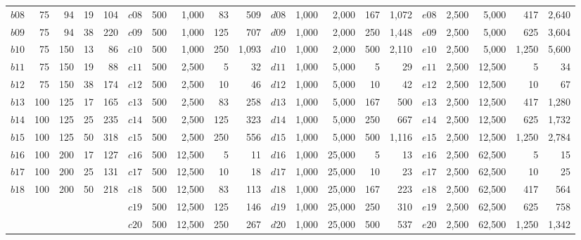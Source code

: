 \documentclass[preprint]{elsarticle}
\begin{document}
\begin{table}[h]
\begin{adjustbox}{width=\textwidth}
\begin{tabular}{lrrrr|lrrrr|lrrrr|lrrrr}
$b08$ & 75 & 94 & 19 & 104& $c08$ & 500 & 1,000 & 83 & 509&  $d08$ & 1,000 & 2,000 & 167 & 1,072& $e08$ & 2,500 & 5,000 & 417 & 2,640\\
$b09$ & 75 & 94 & 38 & 220& $c09$ & 500 & 1,000 & 125 & 707&  $d09$ & 1,000 & 2,000 & 250 & 1,448& $e09$ & 2,500 & 5,000 & 625 & 3,604\\
$b10$ & 75 & 150 & 13 & 86& $c10$ & 500 & 1,000 & 250 &1,093&  $d10$ & 1,000 & 2,000 & 500 & 2,110& $e10$ & 2,500 & 5,000 & 1,250 &5,600\\
$b11$ & 75 & 150 & 19 & 88& $c11$ & 500 & 2,500 & 5 &32&  $d11$ & 1,000 & 5,000 & 5 & 29& $e11$ & 2,500 & 12,500 & 5 &34\\
$b12$ & 75 & 150 & 38 & 174& $c12$ & 500 & 2,500 & 10 & 46&  $d12$ & 1,000 & 5,000 & 10 & 42& $e12$ & 2,500 & 12,500 & 10 & 67\\
$b13$ & 100 & 125 & 17 & 165& $c13$ & 500 & 2,500 & 83 & 258&  $d13$ & 1,000 & 5,000 & 167 & 500& $e13$ & 2,500 & 12,500 & 417 & 1,280\\
$b14$ & 100 & 125 & 25 & 235& $c14$ & 500 & 2,500 & 125 & 323&  $d14$ & 1,000 & 5,000 & 250 & 667& $e14$ & 2,500 & 12,500 & 625 & 1,732\\
$b15$ & 100 & 125 & 50 & 318& $c15$ & 500 & 2,500 & 250 & 556&  $d15$ & 1,000 & 5,000 & 500 & 1,116& $e15$ & 2,500 & 12,500 & 1,250 & 2,784\\
$b16$ & 100 & 200 & 17 & 127& $c16$ & 500 & 12,500 & 5 & 11&  $d16$ & 1,000 & 25,000 & 5 & 13& $e16$ & 2,500 & 62,500 & 5 & 15\\
$b17$ & 100 & 200 & 25 & 131& $c17$ & 500 & 12,500 & 10 & 18&  $d17$ & 1,000 & 25,000 & 10 & 23& $e17$ & 2,500 & 62,500 & 10 & 25\\
$b18$ & 100 & 200 & 50 & 218& $c18$ & 500 & 12,500 & 83 & 113&  $d18$ & 1,000 & 25,000 & 167 & 223& $e18$ & 2,500 & 62,500 & 417 & 564\\
&&&&& $c19$ & 500 & 12,500 & 125 & 146 &$d19$ & 1,000 & 25,000 & 250 & 310& $e19$ & 2,500 & 62,500 & 625 & 758\\
&&&&& $c20$ & 500 & 12,500 & 250 & 267 &$d20$ & 1,000 & 25,000 & 500 & 537& $e20$ & 2,500 & 62,500 & 1,250 & 1,342\\
\bottomrule
\end{tabular}
\end{adjustbox}
\end{table}
\end{document}
